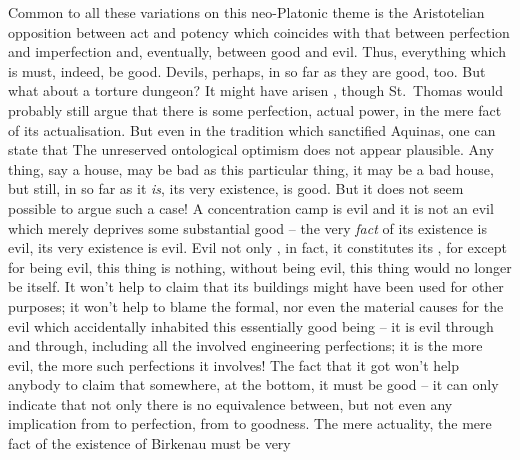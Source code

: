 Common to all these variations on this neo-Platonic theme is the Aristotelian
opposition between act and potency which coincides with that between perfection
and imperfection and, eventually, between good and evil. Thus, everything which
 is must, indeed, be good.  Devils, perhaps, in so far as they
 are good, too. But what about a torture dungeon? It might have arisen
, though St.~Thomas would probably
still argue that there is some perfection, actual power, in the mere fact of its
actualisation.  But even in the tradition which sanctified Aquinas, one can
state that   The unreserved ontological optimism does not appear plausible.
Any thing, say a house, may be bad as this particular thing, it may be a bad
house, but still, in so far as it {\em is}, its very existence, is good. But it
does not seem possible to argue such a case!  A concentration camp is evil and
it is not an evil which merely deprives some substantial good -- the very {\em
  fact} of its existence is evil, its very existence is evil. Evil not only
, in fact, it constitutes its
, for except for being evil, this thing is nothing,
without being evil, this thing would no longer be itself. It won't help to claim
that its buildings might have been used for other purposes; it won't help to
blame the formal, nor even the material causes for the evil which accidentally
inhabited this essentially good being -- it is evil through and through,
including all the involved engineering perfections; it is the more evil, the
more such perfections it involves!  The fact that it got  won't
help anybody to claim that somewhere, at the bottom, it must be good -- it can
only indicate that not only there is no equivalence between, but not even any
implication from  to perfection, from  to goodness.  The
mere actuality, the mere fact of the existence of Birkenau must be very

